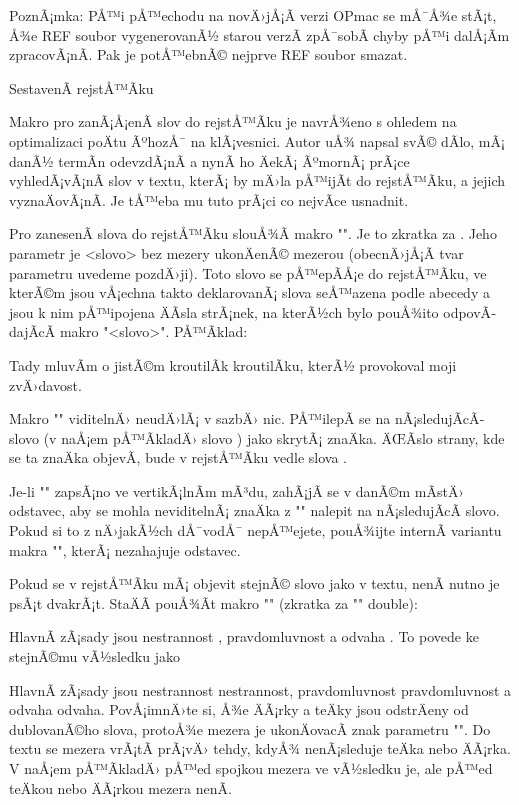 PoznÃ¡mka: PÅ™i pÅ™echodu na novÄ›jÅ¡Ã­ verzi OPmac se mÅ¯Å¾e stÃ¡t, Å¾e REF soubor
vygenerovanÃ½ starou verzÃ­ zpÅ¯sobÃ­ chyby pÅ™i dalÅ¡Ã­m zpracovÃ¡nÃ­. Pak je
potÅ™ebnÃ© nejprve REF soubor smazat.


\sec SestavenÃ­ rejstÅ™Ã­ku

Makro pro zanÃ¡Å¡enÃ­ slov do rejstÅ™Ã­ku je navrÅ¾eno s ohledem na optimalizaci
poÄtu ÃºhozÅ¯ na klÃ¡vesnici. Autor uÅ¾ napsal svÃ© dÃ­lo, mÃ¡ danÃ½ termÃ­n
odevzdÃ¡nÃ­ a nynÃ­ ho ÄekÃ¡ ÃºmornÃ¡ prÃ¡ce vyhledÃ¡vÃ¡nÃ­ slov v textu, kterÃ¡ by
mÄ›la pÅ™ijÃ­t do rejstÅ™Ã­ku, a jejich vyznaÄovÃ¡nÃ­. Je tÅ™eba mu tuto prÃ¡ci co
nejvÃ­ce usnadnit.

Pro zanesenÃ­ slova do rejstÅ™Ã­ku slouÅ¾Ã­ makro "\ii". Je to zkratka za
.
Jeho parametr je <slovo> bez mezery ukonÄenÃ© mezerou (obecnÄ›jÅ¡Ã­ tvar parametru
uvedeme pozdÄ›ji). Toto slovo se pÅ™epÃ­Å¡e do rejstÅ™Ã­ku, ve kterÃ©m jsou vÅ¡echna
takto deklarovanÃ¡ slova seÅ™azena podle abecedy a jsou k nim pÅ™ipojena ÄÃ­sla
strÃ¡nek, na kterÃ½ch bylo pouÅ¾ito odpovÃ­dajÃ­cÃ­ makro "\ii <slovo>". 
PÅ™Ã­klad:

\begtt
Tady mluvÃ­m o jistÃ©m
\ii kroutilÃ­k
kroutilÃ­ku, kterÃ½ provokoval moji zvÄ›davost.
\endtt

Makro "\ii" viditelnÄ› neudÄ›lÃ¡ v sazbÄ› nic. PÅ™ilepÃ­ se na nÃ¡sledujÃ­cÃ­ slovo (v
naÅ¡em pÅ™Ã­kladÄ› slovo ) jako skrytÃ¡ znaÄka. ÄŒÃ­slo strany,
kde se ta znaÄka objevÃ­, bude v rejstÅ™Ã­ku vedle slova .

Je-li "\ii" zapsÃ¡no ve vertikÃ¡lnÃ­m mÃ³du, zahÃ¡jÃ­ se v danÃ©m mÃ­stÄ› odstavec,
aby se mohla neviditelnÃ¡ znaÄka z "\ii" nalepit na nÃ¡sledujÃ­cÃ­ slovo. Pokud
si to z nÄ›jakÃ½ch dÅ¯vodÅ¯ nepÅ™ejete, pouÅ¾ijte internÃ­ variantu makra
"", kterÃ¡ nezahajuje odstavec.

Pokud se v rejstÅ™Ã­ku mÃ¡ objevit stejnÃ© slovo jako v textu, nenÃ­ nutno je psÃ¡t
dvakrÃ¡t. StaÄÃ­ pouÅ¾Ã­t makro "\iid" (zkratka za "\ii" double):

\begtt
HlavnÃ­ zÃ¡sady jsou \iid nestrannost , \iid pravdomluvnost a \iid odvaha .
\endtt
%
To povede ke stejnÃ©mu vÃ½sledku jako

\begtt
HlavnÃ­ zÃ¡sady jsou \ii nestrannost nestrannost,
\ii pravdomluvnost pravdomluvnost a \ii odvaha odvaha.
\endtt
%
PovÅ¡imnÄ›te si, Å¾e ÄÃ¡rky a teÄky jsou odstrÄeny od dublovanÃ©ho slova, protoÅ¾e
mezera je ukonÄovacÃ­ znak parametru "\iid". Do textu se mezera vrÃ¡tÃ­ prÃ¡vÄ›
tehdy, kdyÅ¾ nenÃ¡sleduje teÄka nebo ÄÃ¡rka. V naÅ¡em pÅ™Ã­kladÄ› pÅ™ed spojkou 
mezera ve vÃ½sledku je, ale pÅ™ed teÄkou nebo ÄÃ¡rkou mezera nenÃ­.

